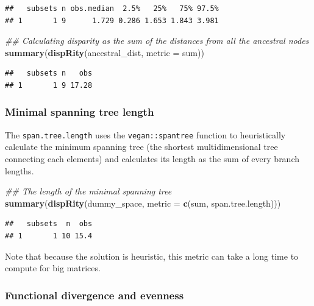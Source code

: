 \documentclass[]{book}
\newenvironment{Shaded}{\begin{snugshade}}{\end{snugshade}}
\newcommand{\CommentTok}[1]{\textcolor[rgb]{0.56,0.35,0.01}{\textit{#1}}}
\newcommand{\DataTypeTok}[1]{\textcolor[rgb]{0.13,0.29,0.53}{#1}}
\newcommand{\KeywordTok}[1]{\textcolor[rgb]{0.13,0.29,0.53}{\textbf{#1}}}
\newcommand{\NormalTok}[1]{#1}
\begin{document}
\begin{verbatim}
##   subsets n obs.median  2.5%   25%   75% 97.5%
## 1       1 9      1.729 0.286 1.653 1.843 3.981
\end{verbatim}

\begin{Shaded}
\begin{Highlighting}[]
\CommentTok{## Calculating disparity as the sum of the distances from all the ancestral nodes}
\KeywordTok{summary}\NormalTok{(}\KeywordTok{dispRity}\NormalTok{(ancestral_dist, }\DataTypeTok{metric =}\NormalTok{ sum))}
\end{Highlighting}
\end{Shaded}

\begin{verbatim}
##   subsets n   obs
## 1       1 9 17.28
\end{verbatim}

\hypertarget{minimal-spanning-tree-length}{%
\subsubsection{Minimal spanning tree length}\label{minimal-spanning-tree-length}}

The \texttt{span.tree.length} uses the \texttt{vegan::spantree} function to heuristically calculate the minimum spanning tree (the shortest multidimensional tree connecting each elements) and calculates its length as the sum of every branch lengths.

\begin{Shaded}
\begin{Highlighting}[]
\CommentTok{## The length of the minimal spanning tree}
\KeywordTok{summary}\NormalTok{(}\KeywordTok{dispRity}\NormalTok{(dummy_space, }\DataTypeTok{metric =} \KeywordTok{c}\NormalTok{(sum, span.tree.length)))}
\end{Highlighting}
\end{Shaded}

\begin{verbatim}
##   subsets  n  obs
## 1       1 10 15.4
\end{verbatim}

Note that because the solution is heuristic, this metric can take a long time to compute for big matrices.

\hypertarget{functional-divergence-and-evenness}{%
\subsubsection{Functional divergence and evenness}\label{functional-divergence-and-evenness}}
\end{document}
